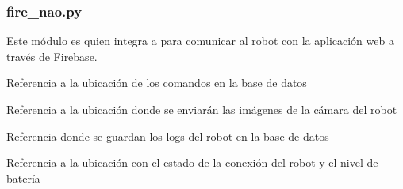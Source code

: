 \subsubsection{fire\_nao.py}
\label{\detokenize{nao_firebase:fire-nao-py}}
Este módulo es quien integra a  para comunicar al robot
con la aplicación web a través de Firebase.

\label{\detokenize{nao_firebase:module-fire_nao}}

\begin{fulllineitems}
\label{\detokenize{nao_firebase:fire_nao.REF_TO_COMMANDS}}
Referencia a la ubicación de los comandos en la base de datos

\end{fulllineitems}


\begin{fulllineitems}
\label{\detokenize{nao_firebase:fire_nao.REF_TO_LIVE_IMAGE}}
Referencia a la ubicación donde se enviarán las imágenes de la cámara del robot

\end{fulllineitems}


\begin{fulllineitems}
\label{\detokenize{nao_firebase:fire_nao.REF_TO_LOGS}}
Referencia donde se guardan los logs del robot en la base de datos

\end{fulllineitems}


\begin{fulllineitems}
\label{\detokenize{nao_firebase:fire_nao.REF_TO_STATUS}}
Referencia a la ubicación con el estado de la conexión del robot y el nivel de batería

\end{fulllineitems}

